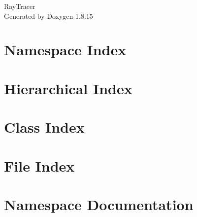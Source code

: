 \let\mypdfximage\pdfximage\def\pdfximage{\immediate\mypdfximage}\documentclass[twoside]{book}
\newcommand{\+}{\discretionary{\mbox{\scriptsize$\hookleftarrow$}}{}{}}
\newcommand{\clearemptydoublepage}{%
  \newpage{\pagestyle{empty}\cleardoublepage}%
}
\begin{document}
\hypersetup{pageanchor=false,
             bookmarksnumbered=true,
             pdfencoding=unicode
            }
\begin{titlepage}
\vspace*{7cm}
\begin{center}%
{\Large Ray\+Tracer }\\
\vspace*{1cm}
{\large Generated by Doxygen 1.8.15}\\
\end{center}
\end{titlepage}
\clearemptydoublepage
{}
\tableofcontents
\clearemptydoublepage
{}
\hypersetup{pageanchor=true}

\chapter{Namespace Index}

\chapter{Hierarchical Index}

\chapter{Class Index}

\chapter{File Index}

\chapter{Namespace Documentation}





\end{document}
